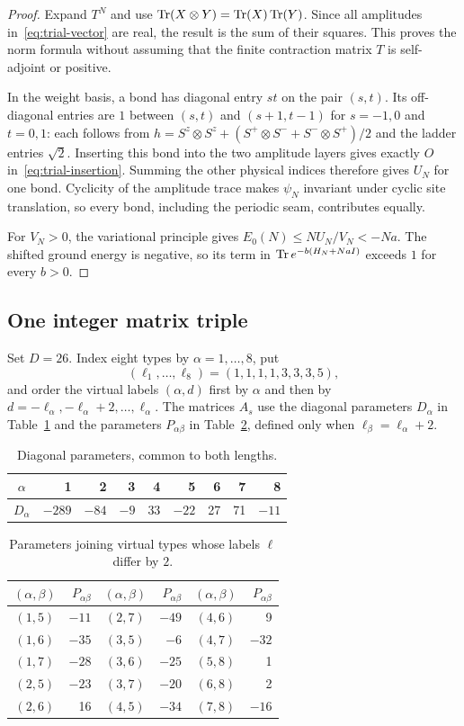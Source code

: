 \begin{proof}
Expand $T^N$ and use $\operatorname{Tr}(X\otimes Y)=\operatorname{Tr}(X)\operatorname{Tr}(Y)$.
Since all amplitudes in~\eqref{eq:trial-vector} are real, the result is
the sum of their squares. This proves the norm formula without assuming
that the finite contraction matrix $T$ is self-adjoint or positive.

In the weight basis, a bond has diagonal entry $st$ on the pair $(s,t)$.
Its off-diagonal entries are $1$ between $(s,t)$ and $(s+1,t-1)$
for $s=-1,0$ and $t=0,1$: each follows from
$h=S^z\otimes S^z+(S^+\otimes S^-+S^-\otimes S^+)/2$
and the ladder entries $\sqrt2$.
Inserting this bond into the two amplitude layers gives exactly
$O$ in~\eqref{eq:trial-insertion}. Summing the other physical indices
therefore gives $U_N$ for one bond.
Cyclicity of the amplitude trace makes $\psi_N$ invariant under cyclic
site translation, so every bond, including the periodic seam, contributes
equally.

For $V_N>0$, the variational principle gives
$E_0(N)\le NU_N/V_N<-Na$. The shifted ground energy is negative, so
its term in $\operatorname{Tr} e^{-b(H_N+NaI)}$ exceeds $1$ for every $b>0$.
\end{proof}

\subsection{One integer matrix triple}

Set $D=26$. Index eight types by $\alpha=1,\ldots,8$,
put
\[
 (\ell_1,\ldots,\ell_8)=(1,1,1,1,3,3,3,5),
\]
and order the virtual labels $(\alpha,d)$ first by $\alpha$ and then by
$d=-\ell_\alpha,-\ell_\alpha+2,\ldots,\ell_\alpha$.
The matrices $A_s$ use the diagonal parameters $D_\alpha$ in
Table~\ref{tab:trial-diagonal} and the parameters
$P_{\alpha\beta}$ in Table~\ref{tab:trial-pairs}, defined only when
$\ell_\beta=\ell_\alpha+2$.

\begin{table}[ht]
\centering
\begin{tabular}{c|rrrrrrrr}
$\alpha$&1&2&3&4&5&6&7&8\\ \hline
$D_\alpha$&$-289$&$-84$&$-9$&33&$-22$&27&71&$-11$
\end{tabular}
\caption{Diagonal parameters, common to both lengths.}
\label{tab:trial-diagonal}
\end{table}

\begin{table}[ht]
\centering
\begin{tabular}{c|r@{\qquad}c|r@{\qquad}c|r}
$(\alpha,\beta)$&$P_{\alpha\beta}$&
$(\alpha,\beta)$&$P_{\alpha\beta}$&
$(\alpha,\beta)$&$P_{\alpha\beta}$\\ \hline
$(1,5)$&$-11$&$(2,7)$&$-49$&$(4,6)$&9\\
$(1,6)$&$-35$&$(3,5)$&$-6$&$(4,7)$&$-32$\\
$(1,7)$&$-28$&$(3,6)$&$-25$&$(5,8)$&1\\
$(2,5)$&$-23$&$(3,7)$&$-20$&$(6,8)$&2\\
$(2,6)$&16&$(4,5)$&$-34$&$(7,8)$&$-16$
\end{tabular}
\caption{Parameters joining virtual types whose labels $\ell$ differ by $2$.}
\label{tab:trial-pairs}
\end{table}

